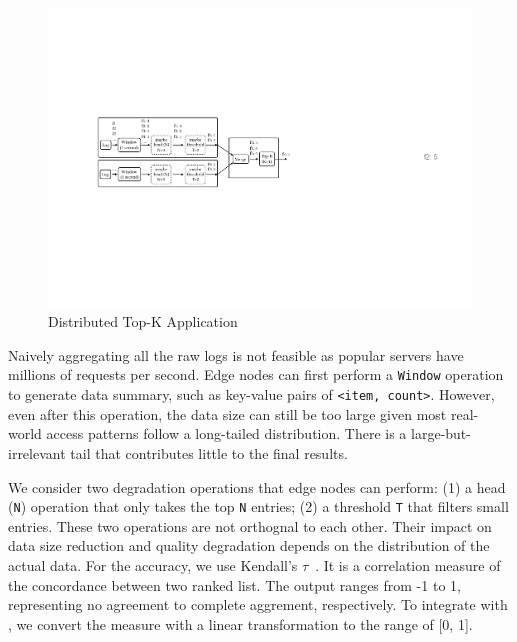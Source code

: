 \begin{figure}
  \centering
  \includegraphics[width=\columnwidth]{figures/topk.pdf}
  \caption{Distributed Top-K Application}
  \label{fig:topk}
\end{figure}

Naively aggregating all the raw logs is not feasible as popular servers have
millions of requests per second. Edge nodes can first perform a \texttt{Window}
operation to generate data summary, such as key-value pairs of \texttt{<item,
  count>}. However, even after this operation, the data size can still be too
large given most real-world access patterns follow a long-tailed
distribution. There is a large-but-irrelevant tail that contributes little to
the final results.

We consider two degradation operations that edge nodes can perform: (1) a head
(\texttt{N}) operation that only takes the top \texttt{N} entries; (2) a
threshold \texttt{T} that filters small entries. These two operations are not
orthognal to each other. Their impact on data size reduction and quality
degradation depends on the distribution of the actual data. For the accuracy, we
use Kendall's $\tau$~\cite{abdi2007kendall}. It is a correlation measure of the
concordance between two ranked list. The output ranges from -1 to 1,
representing no agreement to complete aggrement, respectively. To integrate with
\sysname{}, we convert the measure with a linear transformation to the range of
[0, 1].

